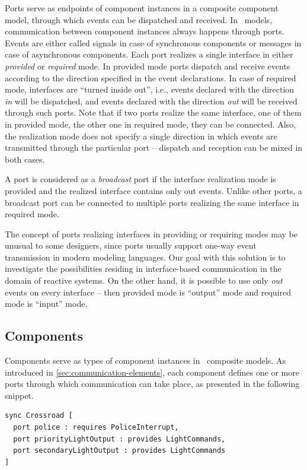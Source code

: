Ports serve as endpoints of component instances in a composite component model,
through which events can be dispatched and received. In \gamma\ models, communication between component
instances always happens through ports. Events are either called signals in case of
synchronous components or messages in case of asynchronous components. Each port realizes
a single interface in either \emph{provided} or \emph{required} mode. In provided mode ports dispatch and receive events according to the direction specified in the event declarations. In case of required mode, interfaces are ``turned inside out'', i.e., events declared with the direction \textsl{in} will be
dispatched, and events declared with the direction \textsl{out} will be received through such ports. Note that if two ports realize the same interface, one of them in provided mode, the other
one in required mode, they can be connected. Also,
the realization mode does not specify a single direction in which events are transmitted
through the particular port -- dispatch and reception can be mixed in both cases.

A port is considered as a \emph{broadcast} port if the interface realization mode is provided and
the realized interface contains only out events. Unlike other ports, a broadcast port can
be connected to multiple ports realizing the same interface in required mode.

The concept of ports realizing interfaces in providing or requiring modes may be unusual to
some designers, since ports usually support one-way event transmission in modern modeling
languages. Our goal with this solution is to investigate the possibilities residing in interface-based
communication in the domain of reactive systems. On the other hand, it is possible to
use only \textsl{out} events on every interface -- then provided mode is ``output'' mode and required
mode is ``input'' mode.

\subsection{Components}
Components serve as types of component instances in \gamma\ composite models. As introduced in \ref{sec:communication-elements}, each component defines one or more ports through which communication can take place, as presented in the following snippet.
\begin{lstlisting}
sync Crossroad [
  port police : requires PoliceInterrupt,
  port priorityLightOutput : provides LightCommands,
  port secondaryLightOutput : provides LightCommands
]
\end{lstlisting}


